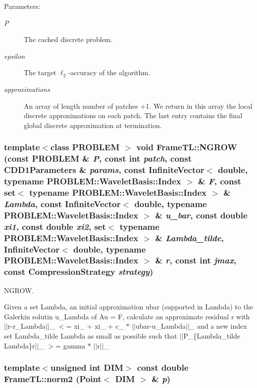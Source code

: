 \begin{Desc}
\item[Parameters:]
\begin{description}
\item[{\em P}]The cached discrete problem. \item[{\em epsilon}]The target $\ell_2$-accuracy of the algorithm. \item[{\em approximations}]An array of length number of patches +1. We return in this array the local discrete approximations on each patch. The last entry contains the final global discrete approximation at termination. \end{description}
\end{Desc}
\hypertarget{namespaceFrameTL_f3d9112d64f468a664317686725617bd}{
\subsubsection[{NGROW}]{\setlength{\rightskip}{0pt plus 5cm}template$<$class PROBLEM $>$ void FrameTL::NGROW (const PROBLEM \& {\em P}, \/  const int {\em patch}, \/  const CDD1Parameters \& {\em params}, \/  const InfiniteVector$<$ double, typename PROBLEM::WaveletBasis::Index $>$ \& {\em F}, \/  const set$<$ typename PROBLEM::WaveletBasis::Index $>$ \& {\em Lambda}, \/  const InfiniteVector$<$ double, typename PROBLEM::WaveletBasis::Index $>$ \& {\em u\_\-bar}, \/  const double {\em xi1}, \/  const double {\em xi2}, \/  set$<$ typename PROBLEM::WaveletBasis::Index $>$ \& {\em Lambda\_\-tilde}, \/  InfiniteVector$<$ double, typename PROBLEM::WaveletBasis::Index $>$ \& {\em r}, \/  const int {\em jmax}, \/  const CompressionStrategy {\em strategy})}}
\label{namespaceFrameTL_f3d9112d64f468a664317686725617bd}


NGROW. 

Given a set Lambda, an initial approximation ubar (supported in Lambda) to the Galerkin solutin u\_\-Lambda of Au = F, calculate an approximate residual r with $|$$|$r-r\_\-Lambda$|$$|$\_ $<$= xi\_ + xi\_ + c\_ $\ast$ $|$$|$ubar-u\_\-Lambda$|$$|$\_ and a new index set Lambda\_\-tilde Lambda as small as possible such that $|$$|$P\_\-\{Lambda\_\-tilde Lambda\}r$|$$|$\_ $>$= gamma $\ast$ $|$$|$r$|$$|$\_ \hypertarget{namespaceFrameTL_6fd34de92145c0f42b41f9b36a379e9f}{
\subsubsection[{norm2}]{\setlength{\rightskip}{0pt plus 5cm}template$<$unsigned int DIM$>$ const double FrameTL::norm2 (Point$<$ DIM $>$ \& {\em p})}}
\label{namespaceFrameTL_6fd34de92145c0f42b41f9b36a379e9f}


